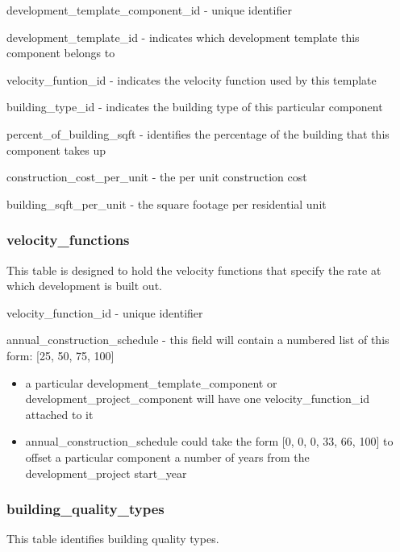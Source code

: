 \begin{description}
\item development\_template\_component\_id - unique identifier
\item development\_template\_id - indicates which development template this component belongs to
\item velocity\_funtion\_id - indicates the velocity function used by this template
\item building\_type\_id - indicates the building type of this particular component
\item percent\_of\_building\_sqft - identifies the percentage of the building that this component takes up
\item construction\_cost\_per\_unit - the per unit construction cost
\item building\_sqft\_per\_unit - the square footage per residential unit 
\end{description}

\subsubsection{velocity\_functions} 

This table is designed to hold the velocity functions that specify the rate at which development is built out.

\begin{description}
\item velocity\_function\_id - unique identifier
\item annual\_construction\_schedule - this field will contain a numbered list of this form: [25, 50, 75, 100]
  \begin{itemize}
  \item a particular development\_template\_component or development\_project\_component will have one velocity\_function\_id attached to it
  \item annual\_construction\_schedule could take the form [0, 0, 0, 33, 66, 100] to offset a particular component a number of years from the 
      development\_project start\_year 
   \end{itemize}
\end{description}

\subsubsection{building\_quality\_types} 

This table identifies building quality types.

